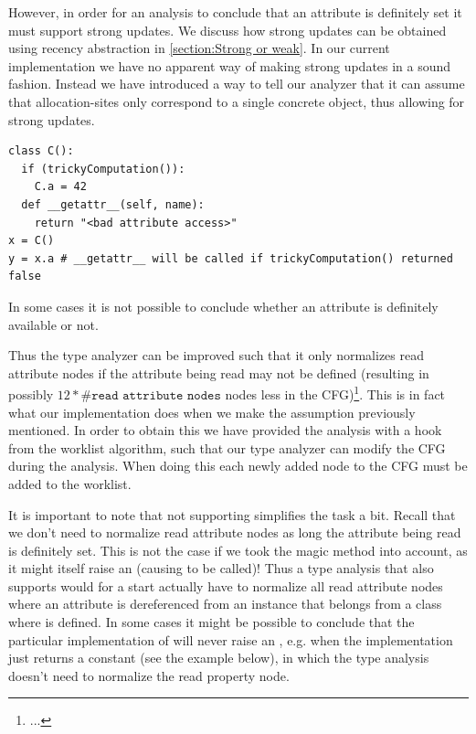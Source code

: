 However, in order for an analysis to conclude that an attribute is definitely set it must support strong updates. We discuss how strong updates can be obtained using recency abstraction in \autoref{section:Strong or weak}. In our current implementation we have no apparent way of making strong updates in a sound fashion. Instead we have introduced a way to tell our analyzer that it can assume that allocation-sites only correspond to a single concrete object, thus allowing for strong updates.

\begin{listing}[H]
  \begin{verbatim}
class C():
  if (trickyComputation()):
    C.a = 42
  def __getattr__(self, name):
    return "<bad attribute access>"
x = C()
y = x.a # __getattr__ will be called if trickyComputation() returned false
  \end{verbatim}
  \caption{In some cases it is not possible to conclude whether an attribute is definitely available or not.}
  \label{ex:DefinitelyAvailable}
\end{listing}

Thus the type analyzer can be improved such that it only normalizes read attribute nodes if the attribute being read may not be defined (resulting in possibly $12 * \#\texttt{read attribute nodes}$ nodes less in the CFG)\footnote{...}. This is in fact what our implementation does when we make the assumption previously mentioned. In order to obtain this we have provided the analysis with a hook from the worklist algorithm, such that our type analyzer can modify the CFG during the analysis. When doing this each newly added node to the CFG must be added to the worklist.

It is important to note that not supporting  simplifies the task a bit. Recall that we don't need to normalize read attribute nodes as long the attribute being read is definitely set. This is not the case if we took the magic method  into account, as it might itself raise an  (causing  to be called)! Thus a type analysis that also supports  would for a start actually have to normalize all read attribute nodes where an attribute is dereferenced from an instance that belongs from a class where  is defined. In some cases it might be possible to conclude that the particular implementation of  will never raise an , e.g. when the implementation just returns a constant (see the example below), in which the type analysis doesn't need to normalize the read property node.

